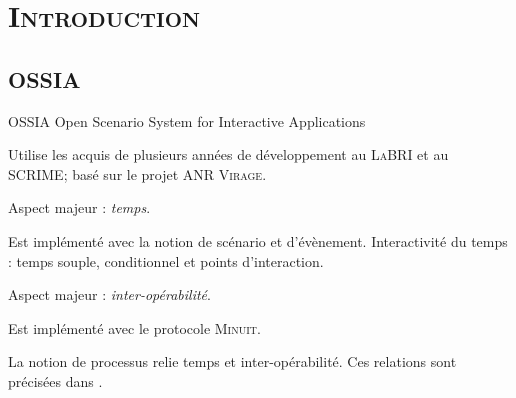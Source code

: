 \section{\scshape Introduction}
\subsection{OSSIA}
\begin{frame}{OSSIA}
	{\large Open Scenario System for Interactive Applications}
	
	Utilise les acquis de plusieurs années de développement au \textsc{LaBRI} et au \textsc{SCRIME}; basé sur le projet \textsc{ANR Virage}.
	
	\vspace{1em}
	Aspect majeur : \emph{temps}.
	\begin{itemize}
		\itemar Est implémenté avec la notion de scénario et d'évènement.
		\itemar Interactivité du temps : temps souple, conditionnel et points d'interaction.
	\end{itemize}
	
	Aspect majeur : \emph{inter-opérabilité}.
	\begin{itemize}
		\itemar Est implémenté avec le protocole \textsc{Minuit}.
	\end{itemize}
	
	La notion de processus relie temps et inter-opérabilité. Ces relations sont précisées dans \cite{hogue2014ossia}.
\end{frame}


